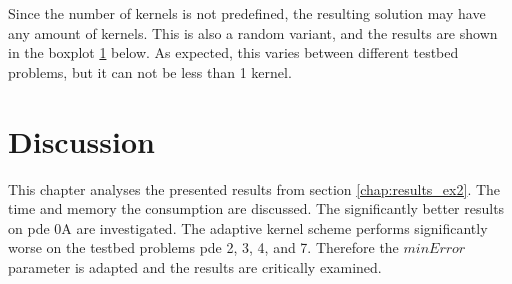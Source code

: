 \documentclass[./\jobname.tex]{subfiles}
\begin{document}
Since the number of kernels is not predefined, the resulting solution may have any amount of kernels. This is also a random variant, and the results are shown in the boxplot \ref{fig:pajade_kernels_boxplot} below. As expected, this varies between different testbed problems, but it can not be less than 1 kernel. 

\begin{figure}[H]
	\centering
	\noindent{}
	\label{fig:pajade_kernels_boxplot}
\end{figure}


\section{Discussion}

This chapter analyses the presented results from section \ref{chap:results_ex2}. The time and memory the consumption are discussed. The significantly better results on \gls{pde} 0A are investigated. The adaptive kernel scheme performs significantly worse on the testbed problems \gls{pde} 2, 3, 4, and 7. Therefore the $minError$ parameter is adapted and the results are critically examined. 
\end{document}
